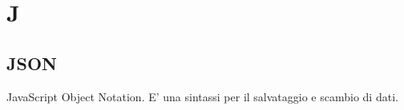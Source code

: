\section*{J}
\subsection*{JSON}
JavaScript Object Notation. E’ una sintassi per il salvataggio e scambio di dati.

